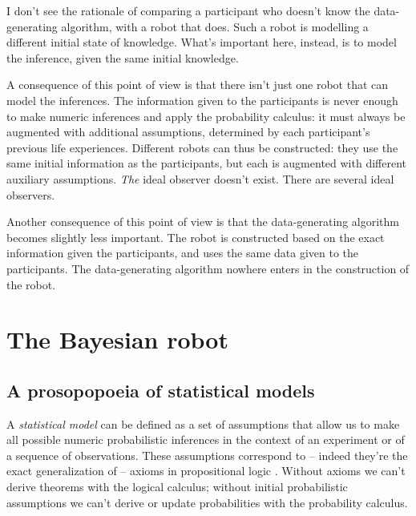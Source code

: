 \documentclass[\ifafour a4paper,12pt,\else a5paper,10pt,\fi%
onecolumn,oneside,article,%
british%
]{memoir}
\theoremstyle{remark}
\theoremstyle{innote}
\newcommand*{\citep}{\parencites}
\renewcommand*{\|}{\mathpunct{|}}
\newcommand*{\chap}{ch.}%
\newcommand*{\cf}{{cf.}}
\begin{document}
I don't see the rationale of comparing a participant who doesn't know the
data-generating algorithm, with a robot that does. Such a robot is
modelling a different initial state of knowledge. What's important here,
instead, is to model the inference, given the same initial knowledge.

A consequence of this point of view is that there isn't just one robot that
can model the inferences. The information given to the participants is
never enough to make numeric inferences and apply the probability calculus:
it must always be augmented with additional assumptions, determined by each
participant's previous life experiences. Different robots can thus be
constructed: they use the same initial information as the participants, but
each is augmented with different auxiliary assumptions. \emph{The} ideal
observer doesn't exist. There are several ideal observers.

Another consequence of this point of view is that the data-generating
algorithm becomes slightly less important. The robot is constructed based
on the exact information given the participants, and uses the same data
given to the participants. The data-generating algorithm nowhere enters in
the construction of the robot.

\section{The Bayesian robot}
\label{sec:bayesian_robot}

\subsection{A prosopopoeia of statistical models}
\label{sec:prosopopoeia}

A \emph{statistical model} can be defined as a set of assumptions that
allow us to make all possible numeric probabilistic inferences in the
context of an experiment or of a sequence of observations. These
assumptions correspond to -- indeed they're the exact generalization of --
axioms in propositional logic
\citep{hailperin1996,hailperin2011,jaynes1994_r2003}. Without axioms we
can't derive theorems with the logical calculus; without initial
probabilistic assumptions we can't derive or update probabilities with the
probability calculus.
\end{document}
